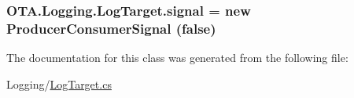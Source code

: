 \subsubsection[{signal}]{ O\+T\+A.\+Logging.\+Log\+Target.\+signal = new {\bf Producer\+Consumer\+Signal} (false)\hspace{0.3cm}{\ttfamily [protected]}}\label{class_o_t_a_1_1_logging_1_1_log_target_a12861383161c25d585f6d9b411cfbe6b}


The documentation for this class was generated from the following file\+:\begin{DoxyCompactItemize}
\item 
Logging/\hyperlink{_log_target_8cs}{Log\+Target.\+cs}\end{DoxyCompactItemize}
